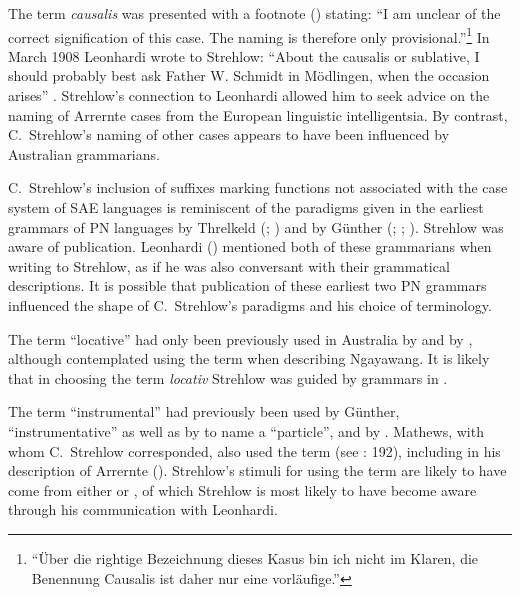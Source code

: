 The term \textit{causalis} was presented with a footnote (\citealt[700]{strehlow_einige_1908}) stating: “I am unclear of the correct signification of this case. The naming is therefore only provisional.”\footnote{“Über die rightige Bezeichnung dieses Kasus bin ich nicht im Klaren, die Benennung Causalis ist daher nur eine vorläufige.”} In March 1908 Leonhardi wrote to Strehlow: “About the causalis or sublative, I should probably best ask Father W. Schmidt in Mödlingen, when the occasion arises” \citep{leonhardi_letter_1908}. Strehlow’s connection to Leonhardi allowed him to seek advice on the naming of Arrernte cases from the European linguistic intelligentsia. By contrast, C.~Strehlow’s naming of other cases appears to have been influenced by Australian grammarians.

C.~Strehlow’s inclusion of suffixes marking functions not associated with the case system of SAE languages is reminiscent of the paradigms given in the earliest grammars of PN languages by Threlkeld (\citeyear{threlkeld_australian_1834}; ) and by Günther (\citeyear{gunther_native_1838}; \citeyear{gunther_lecture_1840}; ). Strehlow was aware of  publication. Leonhardi (\citeyear{leonhardi_letter_1908-1}) mentioned both of these grammarians when writing to Strehlow, as if he was also conversant with their grammatical descriptions. It is possible that  publication of these earliest two PN grammars influenced the shape of C.~Strehlow’s paradigms and his choice of terminology.

The term “locative” had only been previously used in Australia by \citet[346--347]{gunther_lecture_1840} and by \citet[10]{livingstone_grammar_1892}, although \citet[31]{taplin_1879a_nodate} contemplated using the term when describing Ngayawang. It is likely that in choosing the term \textit{locativ} Strehlow was guided by grammars in \citet{fraser_australian_1892}.

The term “instrumental” had previously been used by Günther, “instrumentative” \citeyearpar[346--347]{gunther_lecture_1840} as well as by \citet[6]{moorhouse_vocabulary_1846} to name a “particle'', and by \citet[9]{livingstone_grammar_1892}. Mathews, with whom C.~Strehlow corresponded, also used the term (see \citealt{koch_r_2008}: 192), including in his description of Arrernte (\citeyear{mathews_languages_1907}). Strehlow’s stimuli for using the term are likely to have come from either \citet{gunther_grammar_1892} or \citet{mathews_languages_1907}, of which Strehlow is most likely to have become aware through his communication with Leonhardi.

